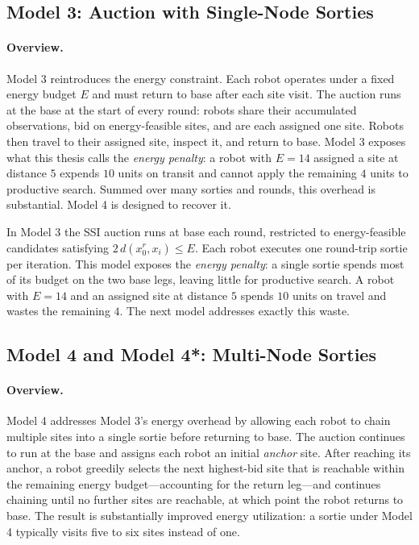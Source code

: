 \begin{doublespacing}
\subsection{Model 3: Auction with Single-Node Sorties}

\paragraph{Overview.} Model 3 reintroduces the energy constraint.
Each robot operates under a fixed energy budget $E$ and must return
to base after each site visit.
The auction runs at the base at the start of every round: robots
share their accumulated observations, bid on energy-feasible sites,
and are each assigned one site.
Robots then travel to their assigned site, inspect it, and return
to base.
Model 3 exposes what this thesis calls the \emph{energy penalty}:
a robot with $E = 14$ assigned a site at distance $5$ expends $10$
units on transit and cannot apply the remaining $4$ units to
productive search.
Summed over many sorties and rounds, this overhead is substantial.
Model 4 is designed to recover it.

In Model 3 the SSI auction runs at base each round, restricted to
energy-feasible candidates satisfying $2\,d(x_0^r, x_i) \leq E$. Each
robot executes one round-trip sortie per iteration. This model
exposes the \emph{energy penalty}: a single sortie spends most of its
budget on the two base legs, leaving little for productive search. A
robot with $E = 14$ and an assigned site at distance $5$ spends $10$
units on travel and wastes the remaining $4$. The next model addresses
exactly this waste.

\subsection{Model 4 and Model 4*: Multi-Node Sorties}\label{sec:foreclosure}

\paragraph{Overview.} Model 4 addresses Model 3's energy overhead by
allowing each robot to chain multiple sites into a single sortie
before returning to base.
The auction continues to run at the base and assigns each robot an
initial \emph{anchor} site.
After reaching its anchor, a robot greedily selects the next
highest-bid site that is reachable within the remaining energy
budget---accounting for the return leg---and continues chaining
until no further sites are reachable, at which point the robot
returns to base.
The result is substantially improved energy utilization: a sortie
under Model 4 typically visits five to six sites instead of one.


\end{doublespacing}
